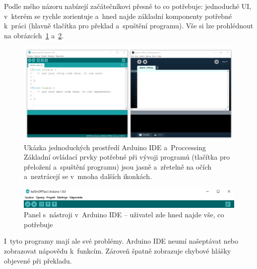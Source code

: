 Podle mého názoru nabízejí začátečníkovi přesně to co potřebuje: jednoduché UI, v~kterém se rychle zorientuje a~hned najde základní komponenty potřebné k~práci (hlavně tlačítka pro překlad a~spuštění programu). 
% 
% 
% 
% 
Vše si lze prohlédnout na obrázcích~\ref{fig:arduino+processing} a~\ref{fig:arduino-ide_tools-panel}.

\begin{figure}[h]
    \centering
    \includegraphics[width=\textwidth]{images/arduino+processing.png}
    \caption[Ukázka jednoduchých prostředí Arduino IDE a~Proccessing]{Ukázka jednoduchých prostředí Arduino IDE a~Proccessing \\
    Základní ovládací prvky potřebné při vývoji programů (tlačítka pro přeložení a~spuštění programu) jsou jasně a~zřetelně na očích a~neztrácejí se v~mnoha dalších ikonkách.}
    \label{fig:arduino+processing}
\end{figure}

\begin{figure}[h]
    \centering
    \includegraphics[width=\textwidth]{images/arduino-ide_tools-panel.png}
    \caption{Panel s~nástroji v~Arduino IDE -- uživatel zde hned najde vše, co potřebuje}
    \label{fig:arduino-ide_tools-panel}
\end{figure}

I~tyto programy mají ale své problémy. 
Arduino IDE neumí našeptávat nebo zobrazovat nápovědu k~funkcím. 
Zároveň špatně zobrazuje chybové hlášky objevené při překladu.

